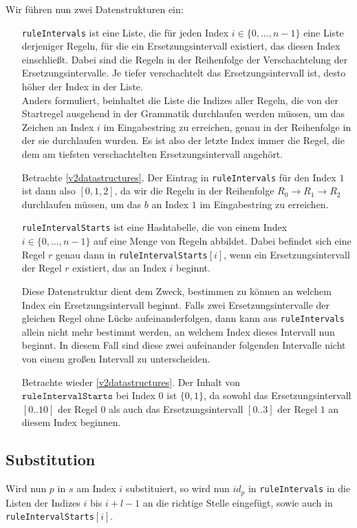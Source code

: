 Wir führen nun zwei Datenstrukturen ein: 
\begin{itemize}[leftmargin=10em]
	\item[\texttt{ruleIntervals}] ist eine Liste, die für jeden Index $i \in \{0, \dots, n - 1\}$ eine Liste derjeniger Regeln, für die ein Ersetzungsintervall existiert, das diesen Index einschließt. Dabei sind die Regeln in der Reihenfolge der Verschachtelung der Ersetzungsintervalle. Je tiefer verschachtelt das Ersetzungsintervall ist, desto höher der Index in der Liste.\\ 
	Anders formuliert, beinhaltet die Liste die Indizes aller Regeln, die von der Startregel ausgehend in der Grammatik durchlaufen werden müssen, um das Zeichen an Index $i$ im Eingabestring zu erreichen, genau in der Reihenfolge in der sie durchlaufen wurden. Es ist also der letzte Index immer die Regel, die dem am tiefsten verschachtelten Ersetzungsintervall angehört. 
	
	Betrachte \autoref{v2datastructures}. Der Eintrag in \texttt{ruleIntervals} für den Index $1$ ist dann also $[0, 1, 2]$, da wir die Regeln in der Reihenfolge $R_0 \rightarrow R_1 \rightarrow R_2$ durchlaufen müssen, um das $b$ an Index $1$ im Eingabestring zu erreichen.
	
	\item[\texttt{ruleIntervalStarts}] ist eine Hashtabelle, die von einem Index $i \in \{0, \dots, n - 1\}$ auf eine Menge von Regeln abbildet. Dabei befindet sich eine Regel $r$ genau dann in \texttt{ruleIntervalStarts}$[i]$, wenn ein Ersetzungsintervall der Regel $r$ existiert, das an Index $i$ beginnt.
	
	Diese Datenstruktur dient dem Zweck, bestimmen zu können an welchem Index ein Ersetzungsintervall beginnt. Falls zwei Ersetzungsintervalle der gleichen Regel ohne Lücke aufeinanderfolgen, dann kann aus \texttt{ruleIntervals} allein nicht mehr bestimmt werden, an welchem Index dieses Intervall nun beginnt. In diesem Fall sind diese zwei aufeinander folgenden Intervalle nicht von einem großen Intervall zu unterscheiden.

    Betrachte wieder \autoref{v2datastructures}. Der Inhalt von\\
    $\texttt{ruleIntervalStarts}$ bei Index $0$ ist $\{0, 1\}$, da sowohl das Ersetzungsintervall $[0..10]$ der Regel $0$ als auch das Ersetzungsintervall $[0..3]$ der Regel $1$ an diesem Index beginnen. 
\end{itemize}



\subsection{Substitution}
Wird nun $p$ in $s$ am Index $i$ substituiert, so wird nun $id_p$ in \texttt{ruleIntervals} in die Listen der Indizes $i$ bis $i + l - 1$ an die richtige Stelle eingefügt, sowie auch in \texttt{ruleIntervalStarts}$[i]$.


